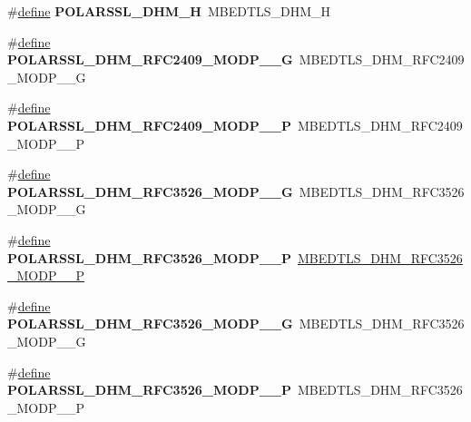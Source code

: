 \begin{DoxyCompactItemize}
\item 
\mbox{\label{compat-1_83_8h_a1a6e69ad223978b2f5e959bfc8ecca55}} 
\#\hyperlink{structdefine}{define} {\bfseries P\+O\+L\+A\+R\+S\+S\+L\+\_\+\+D\+H\+M\+\_\+H}~M\+B\+E\+D\+T\+L\+S\+\_\+\+D\+H\+M\+\_\+H
\item 
\mbox{\label{compat-1_83_8h_a390dad70476de288d7210be9b626b3b6}} 
\#\hyperlink{structdefine}{define} {\bfseries P\+O\+L\+A\+R\+S\+S\+L\+\_\+\+D\+H\+M\+\_\+\+R\+F\+C2409\+\_\+\+M\+O\+D\+P\+\_\+\_\+G}~M\+B\+E\+D\+T\+L\+S\+\_\+\+D\+H\+M\+\_\+\+R\+F\+C2409\+\_\+\+M\+O\+D\+P\+\_\+\_\+G
\item 
\mbox{\label{compat-1_83_8h_a7920b16e2d34a964afb57ae5294f7559}} 
\#\hyperlink{structdefine}{define} {\bfseries P\+O\+L\+A\+R\+S\+S\+L\+\_\+\+D\+H\+M\+\_\+\+R\+F\+C2409\+\_\+\+M\+O\+D\+P\+\_\+\_\+P}~M\+B\+E\+D\+T\+L\+S\+\_\+\+D\+H\+M\+\_\+\+R\+F\+C2409\+\_\+\+M\+O\+D\+P\+\_\+\_\+P
\item 
\mbox{\label{compat-1_83_8h_aeeb38830e9a14b96a6a5d318fe11f3a0}} 
\#\hyperlink{structdefine}{define} {\bfseries P\+O\+L\+A\+R\+S\+S\+L\+\_\+\+D\+H\+M\+\_\+\+R\+F\+C3526\+\_\+\+M\+O\+D\+P\+\_\+\_\+G}~M\+B\+E\+D\+T\+L\+S\+\_\+\+D\+H\+M\+\_\+\+R\+F\+C3526\+\_\+\+M\+O\+D\+P\+\_\+\_\+G
\item 
\mbox{\label{compat-1_83_8h_a35fc616956ba7661e73d34785f960b63}} 
\#\hyperlink{structdefine}{define} {\bfseries P\+O\+L\+A\+R\+S\+S\+L\+\_\+\+D\+H\+M\+\_\+\+R\+F\+C3526\+\_\+\+M\+O\+D\+P\+\_\+\_\+P}~\hyperlink{dhm_8h_a8625d753bfb49304c83ec1a459446cd5}{M\+B\+E\+D\+T\+L\+S\+\_\+\+D\+H\+M\+\_\+\+R\+F\+C3526\+\_\+\+M\+O\+D\+P\+\_\+\_\+P}
\item 
\mbox{\label{compat-1_83_8h_a0d4454178f836ee4e18265203d9b8f7e}} 
\#\hyperlink{structdefine}{define} {\bfseries P\+O\+L\+A\+R\+S\+S\+L\+\_\+\+D\+H\+M\+\_\+\+R\+F\+C3526\+\_\+\+M\+O\+D\+P\+\_\+\_\+G}~M\+B\+E\+D\+T\+L\+S\+\_\+\+D\+H\+M\+\_\+\+R\+F\+C3526\+\_\+\+M\+O\+D\+P\+\_\+\_\+G
\item 
\mbox{\label{compat-1_83_8h_ad4487a84f22e7d49270ac6c0f07dfdee}} 
\#\hyperlink{structdefine}{define} {\bfseries P\+O\+L\+A\+R\+S\+S\+L\+\_\+\+D\+H\+M\+\_\+\+R\+F\+C3526\+\_\+\+M\+O\+D\+P\+\_\+\_\+P}~M\+B\+E\+D\+T\+L\+S\+\_\+\+D\+H\+M\+\_\+\+R\+F\+C3526\+\_\+\+M\+O\+D\+P\+\_\+\_\+P

\end{DoxyCompactItemize}
